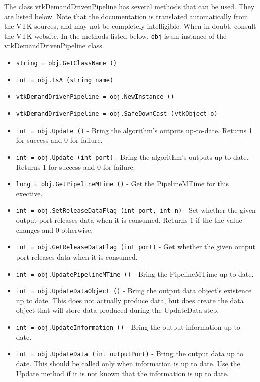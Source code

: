 The class vtkDemandDrivenPipeline has several methods that can be used.
  They are listed below.
Note that the documentation is translated automatically from the VTK sources,
and may not be completely intelligible.  When in doubt, consult the VTK website.
In the methods listed below, \verb|obj| is an instance of the vtkDemandDrivenPipeline class.
\begin{itemize}
\item  \verb|string = obj.GetClassName ()|

\item  \verb|int = obj.IsA (string name)|

\item  \verb|vtkDemandDrivenPipeline = obj.NewInstance ()|

\item  \verb|vtkDemandDrivenPipeline = obj.SafeDownCast (vtkObject o)|

\item  \verb|int = obj.Update ()| -  Bring the algorithm's outputs up-to-date.  Returns 1 for success
 and 0 for failure.

\item  \verb|int = obj.Update (int port)| -  Bring the algorithm's outputs up-to-date.  Returns 1 for success
 and 0 for failure.

\item  \verb|long = obj.GetPipelineMTime ()| -  Get the PipelineMTime for this exective.

\item  \verb|int = obj.SetReleaseDataFlag (int port, int n)| -  Set whether the given output port releases data when it is
 consumed.  Returns 1 if the the value changes and 0 otherwise.

\item  \verb|int = obj.GetReleaseDataFlag (int port)| -  Get whether the given output port releases data when it is consumed.

\item  \verb|int = obj.UpdatePipelineMTime ()| -  Bring the PipelineMTime up to date.

\item  \verb|int = obj.UpdateDataObject ()| -  Bring the output data object's existence up to date.  This does
 not actually produce data, but does create the data object that
 will store data produced during the UpdateData step.

\item  \verb|int = obj.UpdateInformation ()| -  Bring the output information up to date.

\item  \verb|int = obj.UpdateData (int outputPort)| -  Bring the output data up to date.  This should be called only
 when information is up to date.  Use the Update method if it is
 not known that the information is up to date.

\end{itemize}
